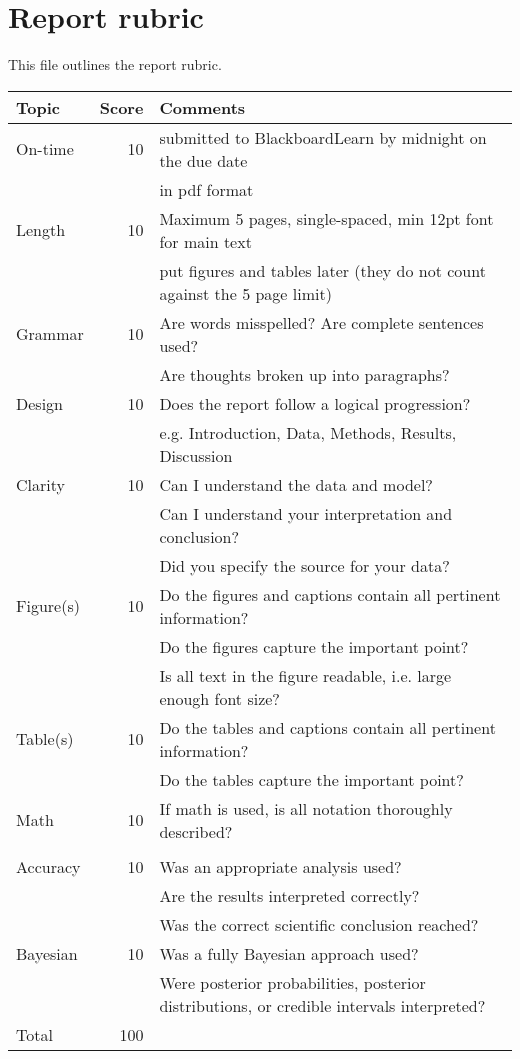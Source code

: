 \documentclass[10pt]{article}
\begin{document}
\chead[\fancyplain{} {}]   {\fancyplain{}{}}

\section*{Report rubric}

This file outlines the report rubric.

\begin{tabular}{|l|r|l|}
\hline
Topic & \multicolumn{1}{l|}{Score} & Comments \\
\hline
On-time   & 10 & submitted to BlackboardLearn by midnight on the due date \\
&& in pdf format \\
\hline
Length & 10 & Maximum 5 pages, single-spaced, min 12pt font for main text \\ 
&& put figures and tables later (they do not count against the 5 page limit) \\
\hline
Grammar & 10 & Are words misspelled? Are complete sentences used?\\
&& Are thoughts broken up into paragraphs? \\
\hline
Design & 10 & Does the report follow a logical progression? \\
&& e.g. Introduction, Data, Methods, Results, Discussion \\
\hline 
Clarity & 10 & Can I understand the data and model? \\
&& Can I understand your interpretation and conclusion? \\
&& Did you specify the source for your data? \\
\hline
Figure(s) & 10 & Do the figures and captions contain all pertinent information? \\
&& Do the figures capture the important point? \\
&& Is all text in the figure readable, i.e. large enough font size? \\
\hline
Table(s) & 10 & Do the tables and captions contain all pertinent information? \\
&& Do the tables capture the important point? \\
\hline
Math & 10 & If math is used, is all notation thoroughly described? \\ &&\\
\hline
Accuracy & 10 & Was an appropriate analysis used? \\
&& Are the results interpreted correctly? \\
&& Was the correct scientific conclusion reached? \\
\hline
Bayesian & 10 & Was a fully Bayesian approach used? \\
&& Were posterior probabilities, posterior distributions, or credible intervals interpreted? \\
\hline
Total &100 &\\
\hline
\end{tabular}
\end{document}
